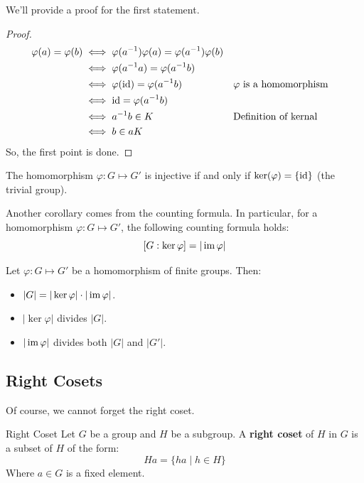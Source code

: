 \documentclass[letterpaper]{article}
\begin{document}
We'll provide a proof for the first statement. 
\begin{mdframed}
    \begin{proof}
        \begin{equation*}
            \begin{aligned}
                \varphi(a) = \varphi(b) &\iff \varphi(a^{-1}) \varphi(a) = \varphi(a^{-1}) \varphi(b) \\ 
                    &\iff \varphi(a^{-1}a) = \varphi(a^{-1}b) \\ 
                    &\iff \varphi(\operatorname{id}) = \varphi(a^{-1} b) && \varphi \text{ is a homomorphism}\\ 
                    &\iff \operatorname{id} = \varphi(a^{-1} b) \\ 
                    &\iff a^{-1} b \in K && \text{Definition of kernal}\\ 
                    &\iff b \in aK 
            \end{aligned}
        \end{equation*}
        So, the first point is done. 
    \end{proof}
\end{mdframed}

\begin{corollary}{}{}
    The homomorphism $\varphi: G \mapsto G'$ is injective if and only if $\ker(\varphi) = \{\operatorname{id}\}$ (the trivial group). 
\end{corollary}

Another corollary comes from the counting formula. In particular, for a homomorphism $\varphi: G \mapsto G'$, the following counting formula holds: 
\[[G: \ker \varphi] = |\operatorname{im} \varphi|\]
\begin{corollary}{}{}
    Let $\varphi: G \mapsto G'$ be a homomorphism of finite groups. Then: 
    \begin{itemize}
        \item $|G| = |\ker \varphi| \cdot |\operatorname{im} \varphi|$.
        \item $|\ker \varphi|$  divides $|G|$. 
        \item $|\operatorname{im} \varphi|$ divides both $|G|$ and $|G'|$. 
    \end{itemize}
\end{corollary}


\subsection{Right Cosets}
Of course, we cannot forget the right coset. 
\begin{definition}{Right Coset}{}
    Let $G$ be a group and $H$ be a subgroup. A \textbf{right coset} of $H$ in $G$ is a subset of $H$ of the form:  
    \[Ha = \{ha \mid h \in H\}\]
    Where $a \in G$ is a fixed element. 
\end{definition}
\end{document}
